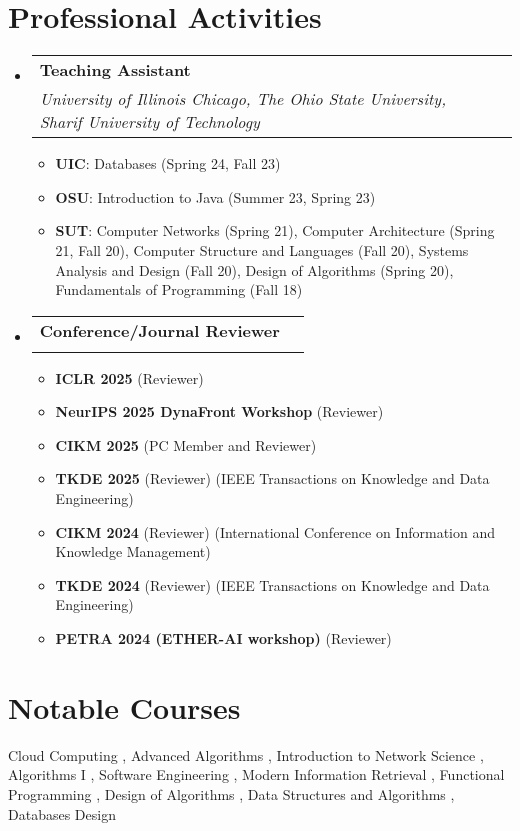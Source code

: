 \documentclass[a4paper,11pt]{article}
\makeatletter
\newcommand{\resumeProject}[4]{
\vspace{0.5mm}\item
    \begin{tabular*}{0.98\textwidth}[t]{l@{\extracolsep{\fill}}r}
        \textbf{#1} & \textit{\footnotesize{#3}} \\
        \footnotesize{\textit{#2}} & \footnotesize{#4}
    \end{tabular*}
    \vspace{-2.4mm}
}
\newcommand{\resumeSubHeadingListStart}{\begin{itemize}[leftmargin=*,labelsep=1mm]}
\newcommand{\resumeItemListStart}{\begin{itemize}[leftmargin=*,labelsep=1mm,itemsep=0.5mm]}
\newcommand{\resumeSubHeadingListEnd}{\end{itemize}\vspace{2mm}}
\newcommand{\resumeItemListEnd}{\end{itemize}\vspace{-2mm}}
\makeatother
\begin{document}
\section{\textbf{Professional Activities}}
\vspace{-0.4mm}
\resumeSubHeadingListStart
\resumeProject
  {Teaching Assistant}
  {University of Illinois Chicago, The Ohio State University, Sharif University of Technology}
  {}
  {}
\resumeItemListStart
  \item \textbf{UIC}: Databases (Spring 24, Fall 23)
  \item \textbf{OSU}: Introduction to Java (Summer 23, Spring 23)
  \item \textbf{SUT}: Computer Networks (Spring 21), Computer Architecture (Spring 21, Fall 20), Computer Structure and Languages (Fall 20), Systems Analysis and Design (Fall 20), Design of Algorithms (Spring 20), Fundamentals of Programming (Fall 18)
\resumeItemListEnd
\resumeProject
  {Conference/Journal Reviewer}
  {}
  {}
  {}
\vspace{-3mm}
\resumeItemListStart
  \item \textbf{ICLR 2025} (Reviewer)
  \item \textbf{NeurIPS 2025 DynaFront Workshop} (Reviewer)
  \item \textbf{CIKM 2025} (PC Member and Reviewer)
  \item \textbf{TKDE 2025} (Reviewer) (IEEE Transactions on Knowledge and Data Engineering)
  \item \textbf{CIKM 2024} (Reviewer) (International Conference on Information and Knowledge Management) 
  \item \textbf{TKDE 2024} (Reviewer) (IEEE Transactions on Knowledge and Data Engineering)
  \item \textbf{PETRA 2024 (ETHER-AI workshop)} (Reviewer)
\resumeItemListEnd

\resumeSubHeadingListEnd
\vspace{-6mm}

\section{\textbf{Notable Courses}}
\small{Cloud Computing \small{}, \space
Advanced Algorithms \small{}, \space
Introduction to Network Science \small{}, \space
Algorithms I \small{}, \space
Software Engineering \small{}, \space
Modern Information Retrieval \small{}, \space
Functional Programming  \small{},
Design of Algorithms \small{}, \space
Data Structures and Algorithms \small{}, \space
Databases Design \small{}}
\end{document}
